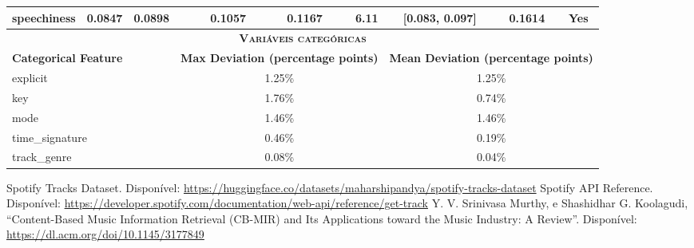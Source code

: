 \documentclass[conference]{IEEEtran}
\begin{document}
\begin{table}[!t]
\begin{tabular}{l rr rr r c c c}
speechiness      & 0.0847     & 0.0898     & 0.1057     & 0.1167    & 6.11 & [0.083, 0.097]         & 0.1614 & Yes \\
\midrule
\multicolumn{9}{c}{\textbf{\scshape Variáveis categóricas}} \\
\midrule
\multicolumn{3}{l}{\textbf{Categorical Feature}} & \multicolumn{3}{c}{\textbf{Max Deviation (percentage points)}} & \multicolumn{3}{c}{\textbf{Mean Deviation (percentage points)}} \\
\midrule
\multicolumn{3}{l}{explicit}       & \multicolumn{3}{c}{1.25\%} & \multicolumn{3}{c}{1.25\%} \\
\multicolumn{3}{l}{key}            & \multicolumn{3}{c}{1.76\%} & \multicolumn{3}{c}{0.74\%} \\
\multicolumn{3}{l}{mode}           & \multicolumn{3}{c}{1.46\%} & \multicolumn{3}{c}{1.46\%} \\
\multicolumn{3}{l}{time\_signature} & \multicolumn{3}{c}{0.46\%} & \multicolumn{3}{c}{0.19\%} \\
\multicolumn{3}{l}{track\_genre}    & \multicolumn{3}{c}{0.08\%} & \multicolumn{3}{c}{0.04\%} \\
\bottomrule
\end{tabular}
\end{table}



\vspace{12pt}

\newpage

\newpage

\begin{thebibliography}{00}
 Spotify Tracks Dataset. Disponível: \url{https://huggingface.co/datasets/maharshipandya/spotify-tracks-dataset}
 Spotify API Reference. Disponível: \url{https://developer.spotify.com/documentation/web-api/reference/get-track}
 Y. V. Srinivasa Murthy, e Shashidhar G. Koolagudi, ``Content-Based Music Information Retrieval (CB-MIR) and Its Applications toward the Music Industry: A Review''. Disponível: \url{https://dl.acm.org/doi/10.1145/3177849} 

\end{thebibliography}
\vspace{12pt}
\end{document}
